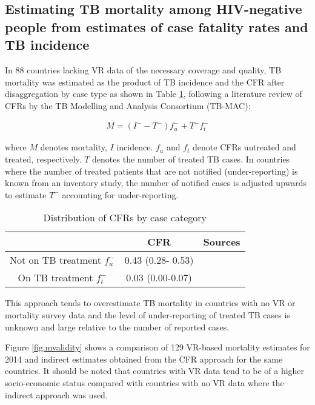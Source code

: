 \subsection{Estimating TB mortality among HIV-negative people from estimates of case fatality rates and TB incidence
}

In 88 countries lacking VR data of the necessary coverage and quality, TB mortality was estimated as the product of TB incidence and the CFR after disaggregation by case type as shown in Table \ref{tab:cfr}, following a literature review of CFRs by the TB Modelling and Analysis Consortium (TB-MAC):

\begin{align*}
M = (I^- -T^-)f^-_u + T^-f^-_t 
\end{align*}

where $M$ denotes mortality, $I$ incidence. $f_u$ and $f_t$ denote CFRs untreated and treated, respectively. $T$ denotes the number of treated TB cases. In countries where the number of treated patients that are not notified (under-reporting) is known from an inventory study, the number of notified cases is adjusted upwards to estimate $T^-$ accounting for under-reporting. 

\begin{table} 
    \begin{tabular}{ c c c }
    \hline
         & CFR & Sources \\ 
         \hline
        Not on TB treatment $f^-_u$ & 0.43 (0.28- 0.53) &  \cite{12742798} \cite{21483732} \\ 
        On TB treatment $f^-_t$ & 0.03 (0.00-0.07) &  \cite{21738585} \\ 
        \hline
    \end{tabular} 
    \caption{Distribution of CFRs by case category} 
    \label{tab:cfr}
\end{table}

This approach tends to overestimate TB mortality in countries with no VR or mortality survey data and the level of under-reporting of treated TB cases is unknown and large relative to the number of reported cases. 

Figure \ref{fig:mvalidity} shows a comparison of 129 VR-based mortality estimates for 2014 and indirect estimates obtained from the CFR approach for the same countries. It should be noted that countries with VR data tend to be of a higher socio-economic status compared with countries with no VR data where the indirect approach was used.


